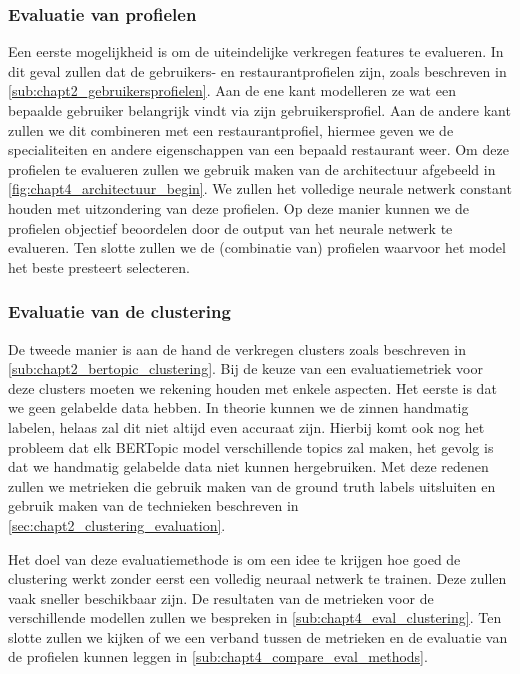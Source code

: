\subsubsection{Evaluatie van profielen}

Een eerste mogelijkheid is om de uiteindelijke verkregen features te evalueren. In dit geval zullen dat de gebruikers- en restaurantprofielen zijn, zoals beschreven in \autoref{sub:chapt2_gebruikersprofielen}. Aan de ene kant modelleren ze wat een bepaalde gebruiker belangrijk vindt via zijn gebruikersprofiel. Aan de andere kant zullen we dit combineren met een restaurantprofiel, hiermee geven we de specialiteiten en andere eigenschappen van een bepaald restaurant weer. Om deze profielen te evalueren zullen we gebruik maken van de architectuur afgebeeld in \autoref{fig:chapt4_architectuur_begin}. We zullen het volledige neurale netwerk constant houden met uitzondering van deze profielen. Op deze manier kunnen we de profielen objectief beoordelen door de output van het neurale netwerk te evalueren. Ten slotte zullen we de (combinatie van) profielen waarvoor het model het beste presteert selecteren.

\subsubsection{Evaluatie van de clustering}

De tweede manier is aan de hand de verkregen clusters zoals beschreven in \autoref{sub:chapt2_bertopic_clustering}. Bij de keuze van een evaluatiemetriek voor deze clusters moeten we rekening houden met enkele aspecten. Het eerste is dat we geen gelabelde data hebben. In theorie kunnen we de zinnen handmatig labelen, helaas zal dit niet altijd even accuraat zijn. Hierbij komt ook nog het probleem dat elk BERTopic model verschillende topics zal maken, het gevolg is dat we handmatig gelabelde data niet kunnen hergebruiken. Met deze redenen zullen we metrieken die gebruik maken van de ground truth labels uitsluiten en gebruik maken van de technieken beschreven in \autoref{sec:chapt2_clustering_evaluation}.

Het doel van deze evaluatiemethode is om een idee te krijgen hoe goed de clustering werkt zonder eerst een volledig neuraal netwerk te trainen. Deze zullen vaak sneller beschikbaar zijn. De resultaten van de metrieken voor de verschillende modellen zullen we bespreken in \autoref{sub:chapt4_eval_clustering}. Ten slotte zullen we kijken of we een verband tussen de metrieken en de evaluatie van de profielen kunnen leggen in \autoref{sub:chapt4_compare_eval_methods}.

